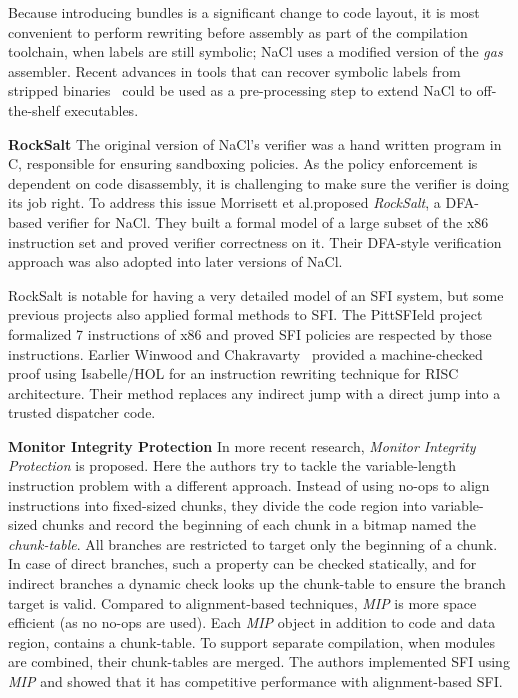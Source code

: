 \documentclass[conference]{IEEEtran}
\begin{document}
Because introducing bundles is a significant change to code layout, it
is most convenient to perform rewriting before assembly as part of the
compilation toolchain, when labels are still symbolic; NaCl uses a
modified version of the {\em gas} assembler.
%
Recent advances in tools that can recover symbolic labels from
stripped binaries~\cite{WangWW2015,Ramblr} could be used as a
pre-processing step to extend NaCl to off-the-shelf executables.

\textbf{RockSalt}
The original version of NaCl's verifier was a hand written program in C, responsible for ensuring sandboxing policies. As the policy enforcement is dependent on code disassembly, it is challenging to make sure the verifier is doing its job right. To address this issue Morrisett  et al.\@ proposed \textit{RockSalt}, \cite{morrisettRocksalt} a DFA-based verifier for NaCl. They built  a formal model of a large subset of the x86 instruction set and proved verifier correctness on it. Their DFA-style verification approach was also adopted into later versions of NaCl. 

RockSalt is notable for having a very detailed model of an SFI system, but some previous projects also applied formal methods to SFI. The PittSFIeld project~\cite{mccamantPittS} formalized 7 instructions of x86 and proved SFI policies are respected by those instructions.  Earlier Winwood and Chakravarty~\cite{winwoodProvably} provided a machine-checked proof using Isabelle/HOL for an instruction rewriting technique for RISC architecture. Their method replaces any indirect jump with a direct jump into a trusted dispatcher code.

\textbf{Monitor Integrity Protection}
In  more recent research, \textit{Monitor Integrity Protection} \cite{niuMIP} is proposed. Here the authors try to tackle the variable-length  instruction problem with a different approach. Instead of using no-ops to align instructions into fixed-sized chunks, they divide  the code region into variable-sized chunks and record the beginning  of each chunk in a bitmap named the \textit{chunk-table}. All branches are restricted to target only the beginning  of a chunk. In case of direct branches, such a property can be checked statically, and for indirect branches  a dynamic check looks up the chunk-table to ensure the branch target is valid. Compared to alignment-based techniques, \textit{MIP} is more space efficient (as no no-ops are used). Each \textit{MIP} object in addition to code and data region, contains a chunk-table. To support separate  compilation, when modules are combined,  their chunk-tables are merged. The authors implemented SFI using \textit{MIP} and showed that it has competitive performance with alignment-based SFI.
\end{document}
